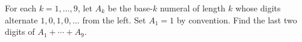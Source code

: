 For each $k=1,\ldots,9$, let $A_k$ be the base-$k$ numeral of length $k$ whose digits alternate $1,0,1,0,\ldots$ from the left. Set $A_1=1$ by convention. Find the last two digits of $A_1+\cdots+A_9$.
